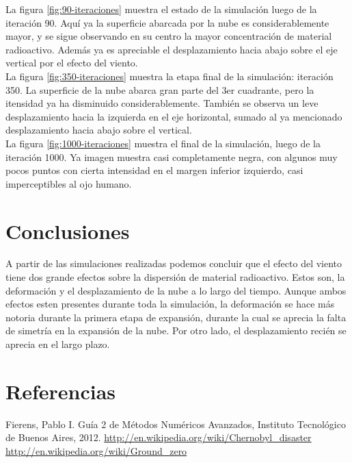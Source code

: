 \documentclass[twocolumn,a4paper,10pt]{article}
\begin{document}
La figura \ref{fig:90-iteraciones} muestra el estado de la simulaci\'on luego de la iteraci\'on 90. Aqu\'i ya la superficie abarcada por la nube es 
considerablemente mayor, y se sigue observando en su centro la mayor concentraci\'on de material radioactivo. Adem\'as ya es apreciable el desplazamiento hacia 
abajo sobre el eje vertical por el efecto del viento.\\

La figura \ref{fig:350-iteraciones} muestra la etapa final de la simulaci\'on: iteraci\'on 350. La superficie de la nube abarca gran parte del 3er cuadrante, 
pero la itensidad ya ha disminuido considerablemente. También se observa un leve desplazamiento hacia la izquierda en el eje horizontal, sumado al ya mencionado 
desplazamiento hacia abajo sobre el vertical. \\

La figura \ref{fig:1000-iteraciones} muestra el final de la simulaci\'on, luego de la iteraci\'on 1000. Ya imagen muestra casi completamente negra, con algunos muy 
pocos puntos con cierta intensidad en el margen inferior izquierdo, casi imperceptibles al ojo humano.


\section{Conclusiones}
\label{sec:conclusiones}

A partir de las simulaciones realizadas podemos concluir que el efecto del viento tiene dos grande efectos sobre la dispersi\'on de material radioactivo. Estos son, 
la deformaci\'on y el desplazamiento de la nube a lo largo del tiempo. Aunque ambos efectos esten presentes durante toda la simulaci\'on, la deformaci\'on se hace
m\'as notoria durante la primera etapa de expansi\'on, durante la cual se aprecia la falta de simetr\'ia en la expansi\'on de la nube. 
Por otro lado, el desplazamiento reci\'en se aprecia en el largo plazo.


\section*{Referencias}

\begin{thebibliography}{99}

     Fierens, Pablo I. Gu\'ia 2 de M\'etodos Num\'ericos Avanzados, Instituto Tecnol\'ogico de Buenos Aires, 2012.
     \url{http://en.wikipedia.org/wiki/Chernobyl_disaster}
     \url{http://en.wikipedia.org/wiki/Ground_zero}
    
\end{thebibliography}
\end{document}
